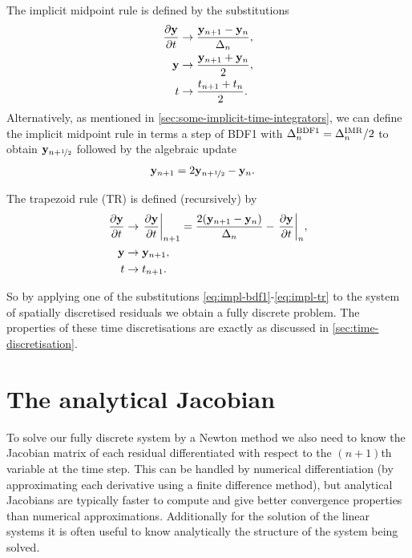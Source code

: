 The implicit midpoint rule is defined by the substitutions
\begin{equation}
  \begin{aligned}
    \frac{\partial \mathbf{y}}{\partial t} &\rightarrow \frac{\mathbf{y}_{n+1} - \mathbf{y}_n}{\Delta_{n}}, \\
    \mathbf{y} &\rightarrow \frac{\mathbf{y}_{n+1} + \mathbf{y}_n}{2}, \\
    t &\rightarrow \frac{t_{n+1} + t_n}{2}.
    \label{eq:impl-imr}
  \end{aligned}
\end{equation}
Alternatively, as mentioned in \cref{sec:some-implicit-time-integrators}, we can define the implicit midpoint rule in terms a step of BDF1 with $\Delta_{n}^{\mathrm{BDF1}} = \Delta_{n}^{\mathrm{IMR}}/2$ to obtain $\mathbf{y}_{n+\nicefrac{1}{2}}$ followed by the algebraic update
\begin{equation}
  \begin{aligned}
    \label{eq:imr-bdf1}
    \mathbf{y}_{n+1} &= 2\mathbf{y}_{n+\nicefrac{1}{2}} - \mathbf{y}_n.
  \end{aligned}
\end{equation}

The trapezoid rule (TR) is defined (recursively) by
\begin{equation}
  \begin{aligned}
    \frac{\partial \mathbf{y}}{\partial t} &\rightarrow {\left. {\frac{\partial \mathbf{y}}{\partial t}} \right|_{n+1}} 
    = \frac{2(\mathbf{y}_{n+1} - \mathbf{y}_n)}{\Delta_{n}} - {\left. {\frac{\partial \mathbf{y}}{\partial t}} \right|_{n}}, \\
    \mathbf{y} &\rightarrow \mathbf{y}_{n+1}, \\
    t &\rightarrow t_{n+1}.
    \label{eq:impl-tr}
  \end{aligned}
\end{equation}

So by applying one of the substitutions \cref{eq:impl-bdf1}-\cref{eq:impl-tr} to the system of spatially discretised residuals we obtain a fully discrete problem.
The properties of these time discretisations are exactly as discussed in \cref{sec:time-discretisation}.




\section{The analytical Jacobian}
\label{sec:llg-jacobian-calculation}

To solve our fully discrete system by a Newton method we also need to know the Jacobian matrix of each residual differentiated with respect to the $(n+1)$th variable at the time step.
This can be handled by numerical differentiation (\eg by approximating each derivative using a finite difference method), but analytical Jacobians are typically faster to compute and give better convergence properties than numerical approximations.
Additionally for the solution of the linear systems it is often useful to know analytically the structure of the system being solved.

